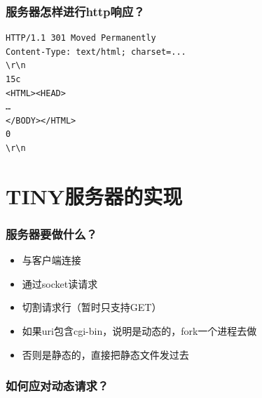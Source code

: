 \documentclass[AutoFakeBold]{beamer}
\begin{document}
{    \begin{frame}[fragile]
        \frametitle{服务器怎样进行http响应？}
        \begin{lstlisting}
HTTP/1.1 301 Moved Permanently
Content-Type: text/html; charset=...
\r\n
15c
<HTML><HEAD>
…
</BODY></HTML>
0
\r\n
        \end{lstlisting}
    \end{frame}
    
    \section{TINY服务器的实现}
    \begin{frame}
        \frametitle{服务器要做什么？}
    
        \begin{itemize}
            \item 与客户端连接
            \item 通过socket读请求
            \item 切割请求行（暂时只支持GET）
            \item 如果uri包含cgi-bin，说明是动态的，fork一个进程去做
            \item 否则是静态的，直接把静态文件发过去
        \end{itemize}
    
    \end{frame}

    \begin{frame}
        \frametitle{如何应对动态请求？}


\end{frame}}
\end{document}
